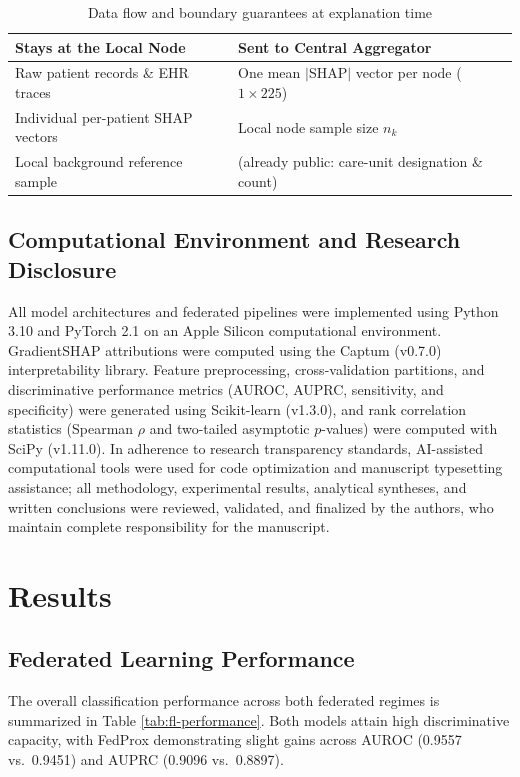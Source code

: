 \documentclass{svproc}
\begin{document}
\begin{table}[t]
\caption{Data flow and boundary guarantees at explanation time}
\label{tab:privacy}
\centering
\begin{tabular}{ll}
\hline
\textbf{Stays at the Local Node} & \textbf{Sent to Central Aggregator} \\
\hline
Raw patient records \& EHR traces & One mean $|$SHAP$|$ vector per node ($1\times225$) \\
Individual per-patient SHAP vectors & Local node sample size $n_k$ \\
Local background reference sample & (already public: care-unit designation \& count) \\
\hline
\end{tabular}
\end{table}

\subsection{Computational Environment and Research Disclosure}
All model architectures and federated pipelines were implemented using Python 3.10 and PyTorch 2.1 on an Apple Silicon computational environment. GradientSHAP attributions were computed using the Captum (v0.7.0) interpretability library. Feature preprocessing, cross-validation partitions, and discriminative performance metrics (AUROC, AUPRC, sensitivity, and specificity) were generated using Scikit-learn (v1.3.0), and rank correlation statistics (Spearman $\rho$ and two-tailed asymptotic $p$-values) were computed with SciPy (v1.11.0). In adherence to research transparency standards, AI-assisted computational tools were used for code optimization and manuscript typesetting assistance; all methodology, experimental results, analytical syntheses, and written conclusions were reviewed, validated, and finalized by the authors, who maintain complete responsibility for the manuscript.

\section{Results}\label{sec:results}

\subsection{Federated Learning Performance}
The overall classification performance across both federated regimes is summarized in Table \ref{tab:fl-performance}. Both models attain high discriminative capacity, with FedProx demonstrating slight gains across AUROC (0.9557 vs.\ 0.9451) and AUPRC (0.9096 vs.\ 0.8897).
\end{document}
